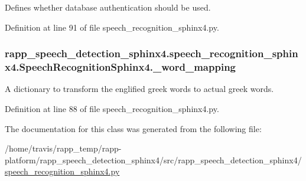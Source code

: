Defines whether database authentication should be used. 



Definition at line 91 of file speech\-\_\-recognition\-\_\-sphinx4.\-py.

\hypertarget{classrapp__speech__detection__sphinx4_1_1speech__recognition__sphinx4_1_1SpeechRecognitionSphinx4_a752dac4e406d54c3f27db026dca60334}{
\subsubsection[{\-\_\-word\-\_\-mapping}]{\setlength{\rightskip}{0pt plus 5cm}rapp\-\_\-speech\-\_\-detection\-\_\-sphinx4.\-speech\-\_\-recognition\-\_\-sphinx4.\-Speech\-Recognition\-Sphinx4.\-\_\-word\-\_\-mapping\hspace{0.3cm}{\ttfamily [private]}}}\label{classrapp__speech__detection__sphinx4_1_1speech__recognition__sphinx4_1_1SpeechRecognitionSphinx4_a752dac4e406d54c3f27db026dca60334}


A dictionary to transform the englified greek words to actual greek words. 



Definition at line 88 of file speech\-\_\-recognition\-\_\-sphinx4.\-py.



The documentation for this class was generated from the following file\-:\begin{DoxyCompactItemize}
\item 
/home/travis/rapp\-\_\-temp/rapp-\/platform/rapp\-\_\-speech\-\_\-detection\-\_\-sphinx4/src/rapp\-\_\-speech\-\_\-detection\-\_\-sphinx4/\hyperlink{speech__recognition__sphinx4_8py}{speech\-\_\-recognition\-\_\-sphinx4.\-py}\end{DoxyCompactItemize}
